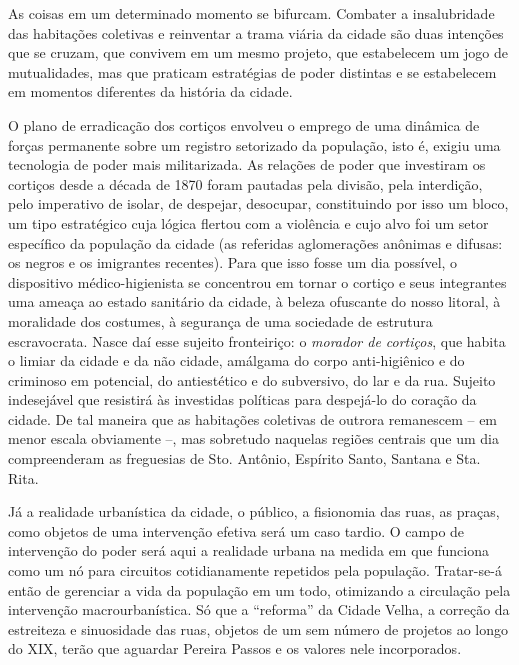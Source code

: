 As coisas em um determinado momento se bifurcam. Combater a
insalubridade das habitações coletivas e reinventar a trama viária da
cidade são duas intenções que se cruzam, que convivem em um mesmo
projeto, que estabelecem um jogo de mutualidades, mas que praticam
estratégias de poder distintas e se estabelecem em momentos diferentes
da história da cidade.

O plano de erradicação dos cortiços envolveu o emprego de uma dinâmica
de forças permanente sobre um registro setorizado da população, isto é,
exigiu uma tecnologia de poder mais militarizada. As relações de poder
que investiram os cortiços desde a década de 1870 foram pautadas pela
divisão, pela interdição, pelo imperativo de isolar, de despejar,
desocupar, constituindo por isso um bloco, um tipo estratégico cuja
lógica flertou com a violência e cujo alvo foi um setor específico da
população da cidade (as referidas aglomerações anônimas e difusas: os
negros e os imigrantes recentes). Para que isso fosse um dia possível, o
dispositivo médico-higienista se concentrou em tornar o cortiço e seus
integrantes uma ameaça ao estado sanitário da cidade, à beleza ofuscante
do nosso litoral, à moralidade dos costumes, à segurança de uma
sociedade de estrutura escravocrata. Nasce daí esse sujeito fronteiriço:
o \emph{morador de cortiços}, que habita o limiar da cidade e da não
cidade, amálgama do corpo anti-higiênico e do criminoso em potencial, do
antiestético e do subversivo, do lar e da rua. Sujeito indesejável que
resistirá às investidas políticas para despejá-lo do coração da cidade.
De tal maneira que as habitações coletivas de outrora remanescem -- em
menor escala obviamente --, mas sobretudo naquelas regiões centrais que
um dia compreenderam as freguesias de Sto. Antônio, Espírito Santo,
Santana e Sta. Rita.

Já a realidade urbanística da cidade, o público, a fisionomia das ruas,
as praças, como objetos de uma intervenção efetiva será um caso tardio.
O campo de intervenção do poder será aqui a realidade urbana na medida
em que funciona como um nó para circuitos cotidianamente repetidos pela
população. Tratar-se-á então de gerenciar a vida da população em um
todo, otimizando a circulação pela intervenção macrourbanística. Só que
a ``reforma'' da Cidade Velha, a correção da estreiteza e sinuosidade
das ruas, objetos de um sem número de projetos ao longo do XIX, terão
que aguardar Pereira Passos e os valores nele incorporados.

